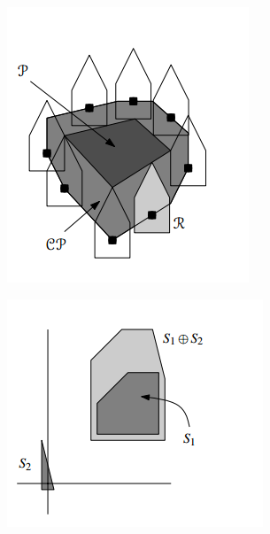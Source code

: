 \documentclass[a4paper,12pt]{report}
\begin{document}
\begin{minipage}[b]{0.45\linewidth}
\begin{center}
\includegraphics[width=0.8\linewidth]{1.png}
\end{center}
\end{minipage}
\begin{minipage}[b]{0.45\linewidth}
\begin{center}
\includegraphics[width=0.8\linewidth]{2.png}
\end{center}
\end{minipage}
\end{document}
